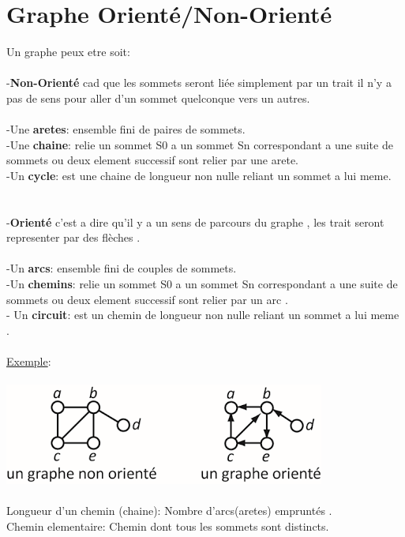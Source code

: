 \documentclass[a4paper,12pt,openany]{book}
\begin{document}

\section{Graphe Orienté/Non-Orienté}
Un graphe peux etre soit:\\
\\
-\textbf{Non-Orienté} cad que les sommets seront liée simplement par un trait il n'y a pas de sens pour aller d'un sommet quelconque vers un autres.\\
\\
-Une \textbf{aretes}: ensemble fini de paires de sommets.\\ 

-Une \textbf{chaine}: relie un sommet S0 a un sommet Sn correspondant a une suite de sommets ou deux element successif sont relier par une arete.\\

-Un \textbf{cycle}: est une chaine de longueur non nulle reliant un sommet a lui meme.\\
\\
\\
-\textbf{Orienté} c'est a dire qu'il y a un sens de parcours du graphe , les trait seront representer par des flèches .\\
\\
-Un \textbf{arcs}: ensemble fini de couples de sommets.\\ 

-Un \textbf{chemins}: relie un sommet S0 a un sommet Sn correspondant a une suite de sommets ou deux element successif sont relier par un arc .\\

- Un \textbf{circuit}: est un chemin de longueur non nulle reliant un sommet a lui meme .\\
\\
\underline{Exemple}: \\
\\
\includegraphics[width=0.5\linewidth,center]{img/gr_n_oriente.png}\\
\\
Longueur d'un chemin (chaine): Nombre d'arcs(aretes) empruntés .\\
Chemin elementaire: Chemin dont tous les sommets sont distincts.\\
\end{document}
